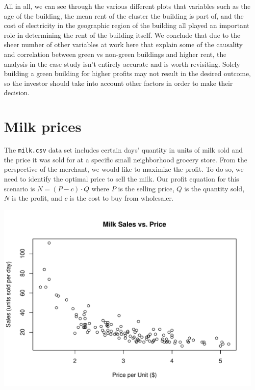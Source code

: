 \documentclass[]{article}
\newenvironment{Shaded}{\begin{snugshade}}{\end{snugshade}}
\newcommand{\CommentTok}[1]{\textcolor[rgb]{0.56,0.35,0.01}{\textit{#1}}}
\newcommand{\DataTypeTok}[1]{\textcolor[rgb]{0.13,0.29,0.53}{#1}}
\newcommand{\KeywordTok}[1]{\textcolor[rgb]{0.13,0.29,0.53}{\textbf{#1}}}
\newcommand{\NormalTok}[1]{#1}
\newcommand{\OperatorTok}[1]{\textcolor[rgb]{0.81,0.36,0.00}{\textbf{#1}}}
\newcommand{\StringTok}[1]{\textcolor[rgb]{0.31,0.60,0.02}{#1}}
\begin{document}
All in all, we can see through the various different plots that
variables such as the age of the building, the mean rent of the cluster
the building is part of, and the cost of electricity in the geographic
region of the building all played an important role in determining the
rent of the building itself. We conclude that due to the sheer number of
other variables at work here that explain some of the causality and
correlation between green vs non-green buildings and higher rent, the
analysis in the case study isn't entirely accurate and is worth
revisiting. Solely building a green building for higher profits may not
result in the desired outcome, so the investor should take into account
other factors in order to make their decision.

\hypertarget{milk-prices}{%
\section{Milk prices}\label{milk-prices}}

The \texttt{milk.csv} data set includes certain days' quantity in units
of milk sold and the price it was sold for at a specific small
neighborhood grocery store. From the perspective of the merchant, we
would like to maximize the profit. To do so, we need to identify the
optimal price to sell the milk. Our profit equation for this scenario is
\(N = (P - c) \cdot Q\) where \(P\) is the selling price, \(Q\) is the
quantity sold, \(N\) is the profit, and \(c\) is the cost to buy from
wholesaler.

\begin{Shaded}
\end{Shaded}

\includegraphics{Report_files/figure-latex/milk2-1.pdf}
\end{document}
